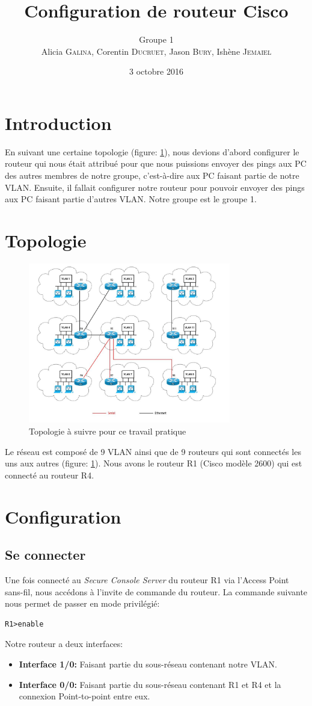 \documentclass[a4paper,10pt]{article}
\title{Configuration de routeur Cisco}
\author{Groupe 1\\Alicia \textsc{Galina}, Corentin \textsc{Ducruet}, Jason \textsc{Bury}, Ishène \textsc{Jemaiel}}
\date{3 octobre 2016}
\begin{document}
\maketitle

\section{Introduction}
En suivant une certaine topologie (figure: \ref{fig:topo}),
nous devions d'abord configurer le routeur qui nous était attribué pour que nous puissions envoyer des pings aux PC des autres membres de notre groupe,
c'est-à-dire aux PC faisant partie de notre VLAN.
Ensuite, il fallait configurer notre routeur pour pouvoir envoyer des pings aux PC faisant partie d'autres VLAN.
Notre groupe est le groupe 1.

\section{Topologie}
\begin{figure}[!h]
 \centering
 \includegraphics[height=7cm]{topo.jpg}
 \caption{Topologie à suivre pour ce travail pratique}
 \label{fig:topo}
\end{figure}%
Le réseau est composé de 9 VLAN ainsi que de 9 routeurs qui sont connectés les uns aux autres (figure: \ref{fig:topo}). Nous avons le routeur R1 (Cisco modèle 2600) qui est connecté au routeur R4.

\section{Configuration}
\subsection{Se connecter}
Une fois connecté au \textit{Secure Console Server} du routeur R1 via l'Access Point sans-fil, nous accédons à l'invite de commande du routeur.
La commande suivante nous permet de passer en mode privilégié:
\begin{verbatim}
R1>enable
\end{verbatim}
Notre routeur a deux interfaces:
\begin{itemize}
 \item \textbf{Interface 1/0:} Faisant partie du sous-réseau contenant notre VLAN.
 \item \textbf{Interface 0/0:} Faisant partie du sous-réseau contenant R1 et R4 et la connexion Point-to-point entre eux.
\end{itemize}
\end{document}
